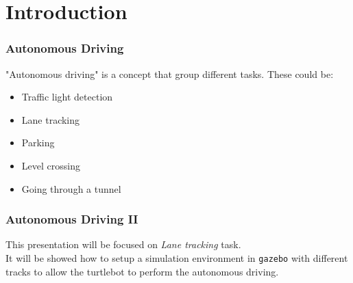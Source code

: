 \section{Introduction}
\begin{frame}
	\frametitle{Autonomous Driving}
	"Autonomous driving" is a concept that group different tasks. These could be:
	\begin{itemize}
		\item Traffic light detection
		\item Lane tracking
		\item Parking
		\item Level crossing
		\item Going through a tunnel
	\end{itemize}
\end{frame}

\begin{frame}
	\frametitle{Autonomous Driving II}
	This presentation will be focused on \textit{Lane tracking} task.\\
	It will be showed how to setup a simulation environment in \texttt{gazebo} with different tracks to allow the turtlebot to perform the autonomous driving.
\end{frame}